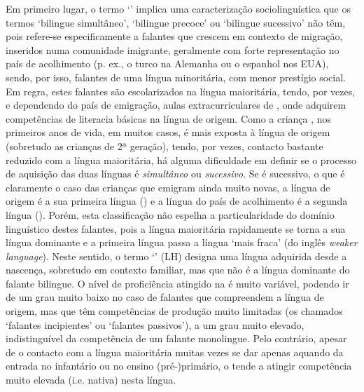 \documentclass[output=paper]{LSP/langsci}
\begin{document}
Em primeiro lugar, o termo `' implica uma caracterização sociolinguística que os termos `bilingue simultâneo', `bilingue precoce' ou `bilingue sucessivo' não têm, pois refere-se especificamente a falantes que crescem em contexto de migração, inseridos numa comunidade imigrante, geralmente com forte representação no país de acolhimento (p. ex., o turco na Alemanha ou o espanhol nos EUA), sendo, por isso, falantes de uma língua minoritária, com menor prestígio social. Em regra, estes falantes são escolarizados na língua maioritária, tendo, por vezes, e dependendo do país de emigração, aulas extracurriculares de , onde adquirem competências de literacia básicas na língua de origem. Como a criança , nos primeiros anos de vida, em muitos casos, é mais exposta à língua de origem (sobretudo as crianças de 2ª geração), tendo, por vezes, contacto bastante reduzido com a língua maioritária, há alguma dificuldade em definir se o processo de aquisição das duas línguas é \textit{simultâneo} ou \textit{sucessivo}. Se é sucessivo, o que é claramente o caso das crianças que emigram ainda muito novas, a língua de origem é a sua primeira língua () e a língua do país de acolhimento é a segunda língua (). Porém, esta classificação não espelha a particularidade do domínio linguístico destes falantes, pois a língua maioritária rapidamente se torna a sua língua dominante e a primeira língua passa a língua `mais fraca' (do inglês \textit{weaker language}). Neste sentido, o termo `' (LH) designa uma língua adquirida desde a nascença, sobretudo em contexto familiar, mas que não é a língua dominante do falante bilingue. O nível de proficiência atingido na  é muito variável, podendo ir de um grau muito baixo no caso de falantes que compreendem a língua de origem, mas que têm competências de produção muito limitadas (os chamados `falantes incipientes' ou `falantes passivos'), a um grau muito elevado, indistinguível da competência de um falante monolingue. Pelo contrário, apesar de o contacto com a língua maioritária muitas vezes se dar apenas aquando da entrada no infantário ou no ensino (pré-)primário, o  tende a atingir competência muito elevada (i.e. nativa) nesta língua. 
\end{document}

